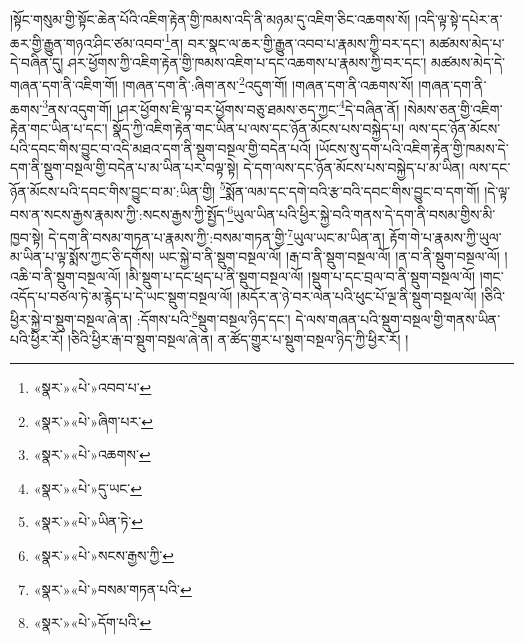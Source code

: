 །སྟོང་གསུམ་གྱི་སྟོང་ཆེན་པོའི་འཇིག་རྟེན་གྱི་ཁམས་འདི་ནི་མཉམ་དུ་འཇིག་ཅིང་འཆགས་སོ། །འདི་ལྟ་སྟེ་དཔེར་ན་ཆར་གྱི་རྒྱུན་གཉའ་ཤིང་ཙམ་འབབ་\footnote{«སྣར་»«པེ་»འབབ་པ་}ན། བར་སྣང་ལ་ཆར་གྱི་རྒྱུན་འབབ་པ་རྣམས་ཀྱི་བར་དང་། མཚམས་མེད་པ་དེ་བཞིན་དུ། ཤར་ཕྱོགས་ཀྱི་འཇིག་རྟེན་གྱི་ཁམས་འཇིག་པ་དང་འཆགས་པ་རྣམས་ཀྱི་བར་དང་། མཚམས་མེད་དེ་གཞན་དག་ནི་འཇིག་གོ། །གཞན་དག་ནི་:ཞིག་ནས་\footnote{«སྣར་»«པེ་»ཞིག་པར་}འདུག་གོ། །གཞན་དག་ནི་འཆགས་སོ། །གཞན་དག་ནི་ཆགས་\footnote{«སྣར་»«པེ་»འཆགས་}ནས་འདུག་གོ། །ཤར་ཕྱོགས་ཇི་ལྟ་བར་ཕྱོགས་བཅུ་ཐམས་ཅད་ཀྱང་\footnote{«སྣར་»«པེ་»དུ་ཡང་}དེ་བཞིན་ནོ། །སེམས་ཅན་གྱི་འཇིག་རྟེན་གང་ཡིན་པ་དང་། སྣོད་ཀྱི་འཇིག་རྟེན་གང་ཡིན་པ་ལས་དང་ཉོན་མོངས་པས་བསྐྱེད་པ། ལས་དང་ཉོན་མོངས་པའི་དབང་གིས་བྱུང་བ་འདི་མཐའ་དག་ནི་སྡུག་བསྔལ་གྱི་བདེན་པའོ། །ཡོངས་སུ་དག་པའི་འཇིག་རྟེན་གྱི་ཁམས་དེ་དག་ནི་སྡུག་བསྔལ་གྱི་བདེན་པ་མ་ཡིན་པར་བལྟ་སྟེ། དེ་དག་ལས་དང་ཉོན་མོངས་པས་བསྐྱེད་པ་མ་ཡིན། ལས་དང་ཉོན་མོངས་པའི་དབང་གིས་བྱུང་བ་མ་:ཡིན་གྱི། \footnote{«སྣར་»«པེ་»ཡིན་ཏེ་}སྨོན་ལམ་དང་དགེ་བའི་རྩ་བའི་དབང་གིས་བྱུང་བ་དག་གོ། །དེ་ལྟ་བས་ན་སངས་རྒྱས་རྣམས་ཀྱི་:སངས་རྒྱས་ཀྱི་སྤྱོད་\footnote{«སྣར་»«པེ་»སངས་རྒྱས་ཀྱི་}ཡུལ་ཡིན་པའི་ཕྱིར་སྐྱེ་བའི་གནས་དེ་དག་ནི་བསམ་གྱིས་མི་ཁྱབ་སྟེ། དེ་དག་ནི་བསམ་གཏན་པ་རྣམས་ཀྱི་:བསམ་གཏན་གྱི་\footnote{«སྣར་»«པེ་»བསམ་གཏན་པའི་}ཡུལ་ཡང་མ་ཡིན་ན། རྟོག་གེ་པ་རྣམས་ཀྱི་ཡུལ་མ་ཡིན་པ་ལྟ་སྨོས་ཀྱང་ཅི་དགོས། ཡང་སྐྱེ་བ་ནི་སྡུག་བསྔལ་ལོ། །རྒ་བ་ནི་སྡུག་བསྔལ་ལོ། །ན་བ་ནི་སྡུག་བསྔལ་ལོ། །འཆི་བ་ནི་སྡུག་བསྔལ་ལོ། །མི་སྡུག་པ་དང་ཕྲད་པ་ནི་སྡུག་བསྔལ་ལོ། །སྡུག་པ་དང་བྲལ་བ་ནི་སྡུག་བསྔལ་ལོ། །གང་འདོད་པ་བཙལ་ཏེ་མ་རྙེད་པ་དེ་ཡང་སྡུག་བསྔལ་ལོ། །མདོར་ན་ཉེ་བར་ལེན་པའི་ཕུང་པོ་ལྔ་ནི་སྡུག་བསྔལ་ལོ། །ཅིའི་ཕྱིར་སྐྱེ་བ་སྡུག་བསྔལ་ཞེ་ན། :དོགས་པའི་\footnote{«སྣར་»«པེ་»དོག་པའི་}སྡུག་བསྔལ་ཉིད་དང་། དེ་ལས་གཞན་པའི་སྡུག་བསྔལ་གྱི་གནས་ཡིན་པའི་ཕྱིར་རོ། །ཅིའི་ཕྱིར་རྒ་བ་སྡུག་བསྔལ་ཞེ་ན། ན་ཚོད་གྱུར་པ་སྡུག་བསྔལ་ཉིད་ཀྱི་ཕྱིར་རོ། །
